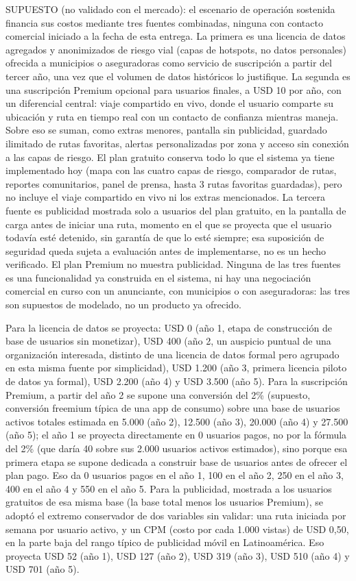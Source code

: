 SUPUESTO (no validado con el mercado): el escenario de operación
sostenida financia sus costos mediante tres fuentes combinadas, ninguna
con contacto comercial iniciado a la fecha de esta entrega. La primera
es una licencia de datos agregados y anonimizados de riesgo vial (capas
de hotspots, no datos personales) ofrecida a municipios o aseguradoras
como servicio de suscripción a partir del tercer año, una vez que el
volumen de datos históricos lo justifique. La segunda es una suscripción
Premium opcional para usuarios finales, a USD 10 por año, con un
diferencial central: viaje compartido en vivo, donde el usuario comparte
su ubicación y ruta en tiempo real con un contacto de confianza mientras
maneja. Sobre eso se suman, como extras menores, pantalla sin
publicidad, guardado ilimitado de rutas favoritas, alertas
personalizadas por zona y acceso sin conexión a las capas de riesgo. El
plan gratuito conserva todo lo que el sistema ya tiene implementado hoy
(mapa con las cuatro capas de riesgo, comparador de rutas, reportes
comunitarios, panel de prensa, hasta 3 rutas favoritas guardadas), pero
no incluye el viaje compartido en vivo ni los extras mencionados. La
tercera fuente es publicidad mostrada solo a usuarios del plan gratuito,
en la pantalla de carga antes de iniciar una ruta, momento en el que se
proyecta que el usuario todavía esté detenido, sin garantía de que lo
esté siempre; esa suposición de seguridad queda sujeta a evaluación
antes de implementarse, no es un hecho verificado. El plan Premium no
muestra publicidad. Ninguna de las tres fuentes es una funcionalidad ya
construida en el sistema, ni hay una negociación comercial en curso con
un anunciante, con municipios o con aseguradoras: las tres son supuestos
de modelado, no un producto ya ofrecido.

Para la licencia de datos se proyecta: USD 0 (año 1, etapa de
construcción de base de usuarios sin monetizar), USD 400 (año 2, un
auspicio puntual de una organización interesada, distinto de una
licencia de datos formal pero agrupado en esta misma fuente por
simplicidad), USD 1.200 (año 3, primera licencia piloto de datos ya
formal), USD 2.200 (año 4) y USD 3.500 (año 5). Para la suscripción
Premium, a partir del año 2 se supone una conversión del 2\% (supuesto,
conversión freemium típica de una app de consumo) sobre una base de
usuarios activos totales estimada en 5.000 (año 2), 12.500 (año 3),
20.000 (año 4) y 27.500 (año 5); el año 1 se proyecta directamente en 0
usuarios pagos, no por la fórmula del 2\% (que daría 40 sobre sus 2.000
usuarios activos estimados), sino porque esa primera etapa se supone
dedicada a construir base de usuarios antes de ofrecer el plan pago. Eso
da 0 usuarios pagos en el año 1, 100 en el año 2, 250 en el año 3, 400
en el año 4 y 550 en el año 5. Para la publicidad, mostrada a los
usuarios gratuitos de esa misma base (la base total menos los usuarios
Premium), se adoptó el extremo conservador de dos variables sin validar:
una ruta iniciada por semana por usuario activo, y un CPM (costo por
cada 1.000 vistas) de USD 0,50, en la parte baja del rango típico de
publicidad móvil en Latinoamérica. Eso proyecta USD 52 (año 1), USD 127
(año 2), USD 319 (año 3), USD 510 (año 4) y USD 701 (año 5).

